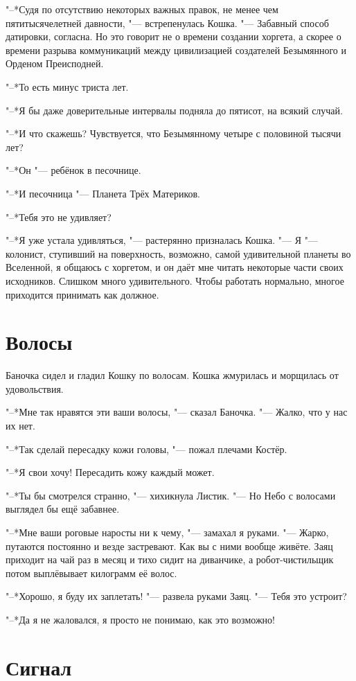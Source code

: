 \documentclass[a4paper,10pt,fleqn]{book}
\begin{document}
"--*Судя по отсутствию некоторых важных правок, не менее чем пятитысячелетней давности, "--- встрепенулась Кошка.
"--- Забавный способ датировки, согласна.
Но это говорит не о времени создании хоргета, а скорее о времени разрыва коммуникаций между цивилизацией создателей Безымянного и Орденом Преисподней.

"--*То есть минус триста лет.

"--*Я бы даже доверительные интервалы подняла до пятисот, на всякий случай.

"--*И что скажешь?
Чувствуется, что Безымянному четыре с половиной тысячи лет?

"--*Он "--- ребёнок в песочнице.

"--*И песочница "--- Планета Трёх Материков.

"--*Тебя это не удивляет?

"--*Я уже устала удивляться, "--- растерянно призналась Кошка.
"--- Я "--- колонист, ступивший на поверхность, возможно, самой удивительной планеты во Вселенной, я общаюсь с хоргетом, и он даёт мне читать некоторые части своих исходников.
Слишком много удивительного.
Чтобы работать нормально, многое приходится принимать как должное.

\section{Волосы}

Баночка сидел и гладил Кошку по волосам.
Кошка жмурилась и морщилась от удовольствия.

"--*Мне так нравятся эти ваши волосы, "--- сказал Баночка.
"--- Жалко, что у нас их нет.

"--*Так сделай пересадку кожи головы, "--- пожал плечами Костёр.

"--*Я свои хочу!
Пересадить кожу каждый может.

"--*Ты бы смотрелся странно, "--- хихикнула Листик.
"--- Но Небо с волосами выглядел бы ещё забавнее.

"--*Мне ваши роговые наросты ни к чему, "--- замахал я руками.
"--- Жарко, путаются постоянно и везде застревают.
Как вы с ними вообще живёте.
Заяц приходит на чай раз в месяц и тихо сидит на диванчике, а робот-чистильщик потом выплёвывает килограмм её волос.

"--*Хорошо, я буду их заплетать! "--- развела руками Заяц.
"--- Тебя это устроит?

"--*Да я не жаловался, я просто не понимаю, как это возможно!

\section{Сигнал}
\end{document}
